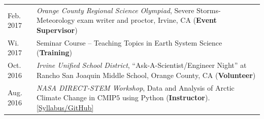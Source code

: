 \documentclass[margin,line,palatino,courier,10pt]{res}
\begin{document}
\begin{resume}
\begin{tabular}{@{}p{0.9in}p{4in}}
Feb. 2017 & \textit{Orange County Regional Science Olympiad}, Severe Storms-Meteorology exam writer and proctor, Irvine, CA (\textbf{Event Supervisor})\\
Wi. 2017 & Seminar Course -- Teaching Topics in Earth System Science (\textbf{Training})\\
Oct. 2016 & \textit{Irvine Unified School District}, ``Ask-A-Scientist/Engineer Night'' at Rancho San Joaquin Middle School, Orange County, CA (\textbf{Volunteer})\\
Aug. 2016 & \textit{NASA DIRECT-STEM Workshop}, Data and Analysis of Arctic Climate Change in CMIP$5$ using Python (\textbf{Instructor}). \href{https://github.com/strongh/DIRECT-STEM-climate-workshop}{[Syllabus/GitHub]}\\
\end{tabular}

\noindent\textcolor{Cerulean}{\makebox[\linewidth][r]{\rule{\textwidth}{5pt}}}

\end{resume}
\end{document}
